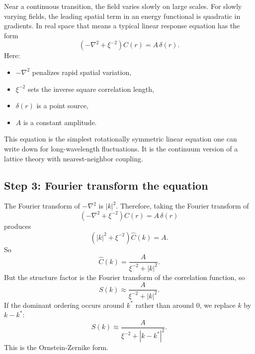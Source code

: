 \documentclass[11pt]{article}
\begin{document}
Near a continuous transition, the field varies slowly on large scales. For slowly varying fields, the leading spatial term in an energy functional is quadratic in gradients. In real space that means a typical linear response equation has the form
\begin{equation}
    \left(-\nabla^2 + \xi^{-2}\right) C(r) = A\,\delta(r).
\end{equation}
Here:
\begin{itemize}
    \item $-\nabla^2$ penalizes rapid spatial variation,
    \item $\xi^{-2}$ sets the inverse square correlation length,
    \item $\delta(r)$ is a point source,
    \item $A$ is a constant amplitude.
\end{itemize}

This equation is the simplest rotationally symmetric linear equation one can write down for long-wavelength fluctuations. It is the continuum version of a lattice theory with nearest-neighbor coupling.

\subsection{Step 3: Fourier transform the equation}

The Fourier transform of $-\nabla^2$ is $|k|^2$. Therefore, taking the Fourier transform of
\begin{equation}
    \left(-\nabla^2 + \xi^{-2}\right) C(r) = A\,\delta(r)
\end{equation}
produces
\begin{equation}
    \left(|k|^2 + \xi^{-2}\right) \widehat{C}(k) = A.
\end{equation}
So
\begin{equation}
    \widehat{C}(k) = \frac{A}{\xi^{-2}+|k|^2}.
\end{equation}
But the structure factor is the Fourier transform of the correlation function, so
\begin{equation}
    S(k) \approx \frac{A}{\xi^{-2}+|k|^2}.
\end{equation}
If the dominant ordering occurs around $k^*$ rather than around $0$, we replace $k$ by $k-k^*$:
\begin{equation}
    S(k) \approx \frac{A}{\xi^{-2}+|k-k^*|^2}.
\end{equation}
This is the Ornstein-Zernike form.
\end{document}
